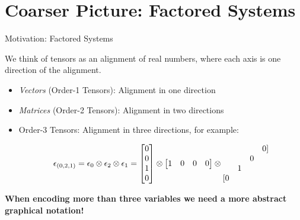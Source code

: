 \documentclass{beamer}
\begin{document}
    \section{Coarser Picture: Factored Systems} %

    \begin{frame}{Motivation: Factored Systems}

        We think of tensors as an alignment of real numbers, where each axis is one direction of the alignment.
        \begin{itemize}
            \item \emph{Vectors} (Order-1 Tensors): Alignment in one direction
            \item \emph{Matrices} (Order-2 Tensors): Alignment in two directions
            \item Order-3 Tensors: Alignment in three directions, for example:

            \begin{align*}
                \epsilon_{(0,2,1)}
                = \epsilon_{0} \otimes \epsilon_{2} \otimes \epsilon_{1}=
                \begin{bmatrix}
                    0 \\ 0 \\ 1 \\ 0
                \end{bmatrix}
                \otimes
                \begin{bmatrix}
                    1 & 0 & 0 & 0
                \end{bmatrix}
                \otimes
                \begin{matrix}
                    & & & 0 ] \\
                    & & 0 & \\
                    & 1 & & \\
                    [0 & & &
                \end{matrix}
            \end{align*}
        \end{itemize}

        \begin{center}
            \bf When encoding more than three variables we need a more abstract graphical notation!
        \end{center}

    \end{frame}
\end{document}

